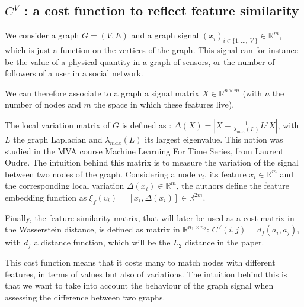 \documentclass[a4paper,11pt]{article}
\begin{document}
\subsection{$C^V$ : a cost function to reflect feature similarity}
\label{CV}
We consider a graph $G=(V, E)$ and a graph signal $(x_i)_{i \in \{1, ..., |V| \} } \in \mathbb{R}^m$, which is just a function on the vertices of the graph. 
This signal can for instance be the value of a physical quantity in a graph of sensors, or the number of followers of a user in a social network.

We can therefore associate to a graph a signal matrix $X \in \mathbb{R}^{n \times m}$ (with $n$ the number of nodes and $m$ the space in which these features live).

The local variation matrix of $G$ is defined as : $\Delta(X) = | X - \frac{1}{\lambda_{max}(L)} L^j X  |$, with $L$ the graph Laplacian and $\lambda_{max}(L)$ its largest eigenvalue.
This notion was studied in the MVA course Machine Learning For Time Series, from Laurent Oudre. 
The intuition behind this matrix is to measure the variation of the signal between two nodes of the graph.
Considering a node $v_i$, its feature $x_i \in \mathbb{R}^m$ and the corresponding local variation $\Delta(x_i) \in \mathbb{R}^m$, the authors define the feature embedding function as $\xi_f(v_i) = [x_i, \Delta(x_i)] \in \mathbb{R}^{2m}$.

Finally, the feature similarity matrix, that will later be used as a cost matrix in the Wasserstein distance, is defined as  matrix in $\mathbb{R}^{n_1 \times n_2}$: $C^V(i,j) = d_f(a_i, a_j) $, with $d_f$ a distance function, which will be the $L_2$ distance in the paper.

This cost function means that it costs many to match nodes with different features, in terms of values but also of variations. 
The intuition behind this is that we want to take into account the behaviour of the graph signal when assessing the difference between two graphs.
\end{document}
